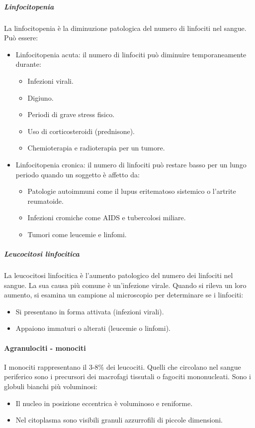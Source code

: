 				\subparagraph{Linfocitopenia}
				La linfocitopenia \`e la diminuzione patologica del numero di linfociti nel sangue.
				Pu\`o essere:
				\begin{itemize}
					\item Linfocitopenia acuta: il numero di linfociti pu\`o diminuire temporaneamente durante:
						\begin{itemize}
							\item Infezioni virali.
							\item Digiuno.
							\item Periodi di grave stress fisico.
							\item Uso di corticosteroidi (prednisone).
							\item Chemioterapia e radioterapia per un tumore.
						\end{itemize}
					\item Linfocitopenia cronica: il numero di linfociti pu\`o restare basso per un lungo periodo quando un soggetto \`e affetto da: 
						\begin{itemize}
							\item Patologie autoimmuni come il lupus eritematoso sistemico o l'artrite reumatoide.
							\item Infezioni cromiche come AIDS e tubercolosi miliare.
							\item Tumori come leucemie e linfomi.
						\end{itemize}
				\end{itemize}
				
				\subparagraph{Leucocitosi linfocitica}
				La leucocitosi linfocitica \`e l'aumento patologico del numero dei linfociti nel sangue. 
				La sua causa pi\`u comune \`e un'infezione virale.
				Quando si rileva un loro aumento, si esamina un campione al microscopio per determinare se i linfociti:
				\begin{itemize}
					\item Si presentano in forma attivata (infezioni virali).
					\item Appaiono immaturi o alterati (leucemie o linfomi).
				\end{itemize}
			\paragraph{Agranulociti - monociti}
			I monociti rappresentano il $3$-$8\%$ dei leucociti. 
			Quelli che circolano nel sangue periferico sono i precursori dei macrofagi tissutali o fagociti mononucleati. 
			Sono i globuli bianchi pi\`u voluminosi:
			\begin{itemize}
				\item Il nucleo in posizione eccentrica \`e voluminoso e reniforme.
				\item Nel citoplasma sono visibili granuli azzurrofili di piccole dimensioni.
			\end{itemize}


